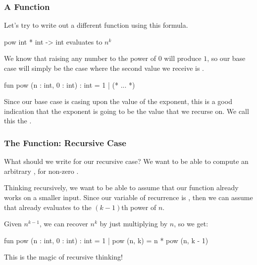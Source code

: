 \documentclass[aspectratio=169]{beamer}
\begin{document}
\begin{frame}[fragile]
  \frametitle{A  Function}

  Let's try to write out a different function using this formula. 

  \spec
    {pow}
    {int * int -> int}
    {}
    { evaluates to $n^k$}

  \pause
  \vspace{\fill}

  We know that raising any number to the power of $0$ will produce $1$, so 
  our base case will simply be the case where the second value we receive is 
  .

  \pause
  \begin{codeblock}
    fun pow (n : int, 0 : int) : int = 1 
      | (* ... *)
  \end{codeblock}

  \pause
  \vspace{\fill}

  Since our base case is casing upon the value of the exponent, this is a good
  indication that the exponent is going to be the value that we recurse on. We
  call this the . 
\end{frame}

\begin{frame}[fragile]
  \frametitle{The  Function: Recursive Case}

  What should we write for our recursive case? We want to be able to compute
  an arbitrary , for non-zero .

  \pause
  \vspace{\fill}

  Thinking recursively, we want to be able to assume that our function already
  works on a smaller input. Since our variable of recurrence is , then
  we can assume that  already evaluates to the
  $(k-1)$th power of $n$.
  
  \pause
  \vspace{\fill}

  Given $n^{k - 1}$, we can recover $n^k$ by just multiplying by $n$, so we get:

  \begin{codeblock}
    fun pow (n : int, 0 : int) : int = 1 
      | pow (n, k) = n * pow (n, k - 1) 
  \end{codeblock}

  \pause
  \vspace{\fill}

  This is the magic of recursive thinking!
\end{frame}
\end{document}
